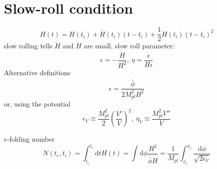 \section{Slow-roll condition}
\begin{equation}
  H(t) = H(t_i) + \dot{H}(t_i)(t-t_i) + \frac{1}{2} H(t_i) (t-t_i)^{2}
\end{equation}
slow rolling tells $\dot{H}$ and $\ddot{H}$ are small, slow roll parameter:
\begin{equation}
  \epsilon = - \frac{\dot{H}}{H^{2}},\ \eta = \frac{\dot{\epsilon}}{H\epsilon}
\end{equation}
Alternative definitions 
\begin{equation}
  \epsilon = \frac{\dot{\bar{\phi}}}{2M_{pl}^{2} H^{2}}
\end{equation}
or, using the potential
\begin{equation}
  \epsilon_{V} \equiv \frac{M_{pl}^{2}}{2} \left( \frac{V'}{V} \right)^{2}, \ \eta_{V} \equiv \frac{M_{pl}^{2} V''}{V}
\end{equation}

$e$-folding number
\begin{equation}
  N(t_e,t_i) = \int _{t_i}^{t_e}\mathrm{d} t H(t) = \int \mathrm{d} \phi \frac{H^{2}}{\dot{\bar{\phi}}H} = \frac{1}{M_{pl}} \int _{\phi _i}^{\phi _{e}} \frac{\mathrm{d} \phi }{\sqrt{2\epsilon_{V}}}
\end{equation}
